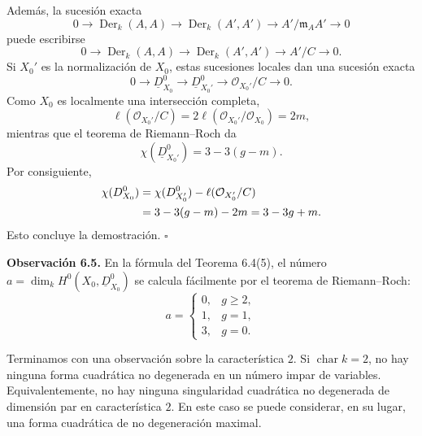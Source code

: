 Además, la sucesión exacta
\[
0\longrightarrow\operatorname{Der}_k(A,A)
 \longrightarrow\operatorname{Der}_k(A',A')
 \longrightarrow A'/\mathfrak m_AA'\longrightarrow0
\]
puede escribirse
\[
0\longrightarrow\operatorname{Der}_k(A,A)
 \longrightarrow\operatorname{Der}_k(A',A')
 \longrightarrow A'/C\longrightarrow0.
\]
Si $X_0'$ es la normalización de $X_0$, estas sucesiones locales dan
una sucesión exacta
\[
0\longrightarrow\underline D^0_{X_0}
 \longrightarrow\underline D^0_{X_0'}
 \longrightarrow\mathcal O_{X_0'}/C\longrightarrow0.
\]
Como $X_0$ es localmente una intersección completa,
\[
\ell(\mathcal O_{X_0'}/C)
=2\ell(\mathcal O_{X_0'}/\mathcal O_{X_0})=2m,
\]
mientras que el teorema de Riemann--Roch da
\[
\chi(\underline D^0_{X_0'})=3-3(g-m).
\]
Por consiguiente,
\[
\begin{aligned}
\chi(\underline D^0_{\sisi{X^0_0}{X_0}})
&=\chi(\underline D^0_{X_0'})
 -\ell(\mathcal O_{X_0'}/C)\\
&=3-3(g-m)-2m=3-3g+m.
\end{aligned}
\]
Esto concluye la demostración.
\hfill$\square$

\par\medskip
\noindent\textbf{Observación 6.5.}
En la fórmula del Teorema 6.4(5), el número
$a=\dim_kH^0(X_0,\underline D^0_{X_0})$ se calcula fácilmente por el
teorema de Riemann--Roch:
\[
a=
\begin{cases}
0,&g\geq2,\\
1,&g=1,\\
3,&g=0.
\end{cases}
\]

Terminamos con una observación sobre la característica $2$. Si
$\operatorname{char}k=2$, no hay ninguna forma cuadrática no
degenerada en un número impar de variables. Equivalentemente, no hay
ninguna singularidad cuadrática no degenerada de dimensión par en
característica $2$. En este caso se puede considerar, en su lugar, una
forma cuadrática de no degeneración maximal.
